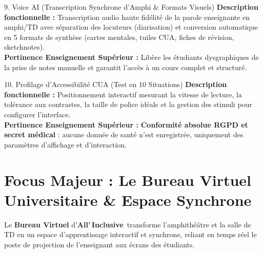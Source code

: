 \documentclass[11pt,a4paper]{article}
\newcommand{\AIBrand}{\textbf{\textcolor{primaryRed}{A}ll'\,\textcolor{primaryRed}{I}nclusive}}
\begin{document}
\begin{featureBox}[softPurple]{9. Voice AI (Transcription Synchrone d'Amphi \& Formats Visuels)}
\textbf{Description fonctionnelle :} Transcription audio haute fidélité de la parole enseignante en amphi/TD avec séparation des locuteurs (diarisation) et conversion automatique en 5 formats de synthèse (cartes mentales, tuiles CUA, fiches de révision, sketchnotes).\\
\textbf{Pertinence Enseignement Supérieur :} Libère les étudiants dysgraphiques de la prise de notes manuelle et garantit l'accès à un cours complet et structuré.
\end{featureBox}

\begin{featureBox}[accentBlue]{10. Profilage d'Accessibilité CUA (Test en 10 Situations)}
\textbf{Description fonctionnelle :} Positionnement interactif mesurant la vitesse de lecture, la tolérance aux contrastes, la taille de police idéale et la gestion des stimuli pour configurer l'interface.\\
\textbf{Pertinence Enseignement Supérieur :} \textbf{Conformité absolue RGPD et secret médical} : aucune donnée de santé n'est enregistrée, uniquement des paramètres d'affichage et d'interaction.
\end{featureBox}

\newpage
\section{Focus Majeur : Le Bureau Virtuel Universitaire \& Espace Synchrone}

Le \textbf{Bureau Virtuel} d'\AIBrand\ transforme l'amphithéâtre et la salle de TD en un espace d'apprentissage interactif et synchrone, reliant en temps réel le poste de projection de l'enseignant aux écrans des étudiants.
\end{document}
